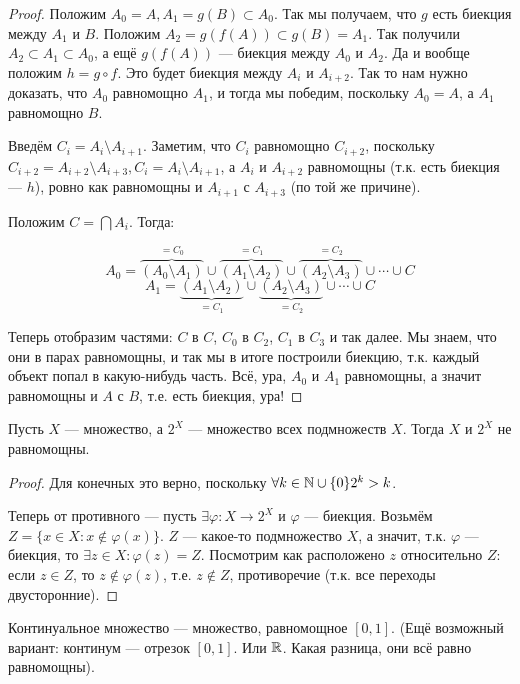 \begin{proof}
	Положим $A_0 = A, A_1 = g(B) \subset A_0$. Так мы получаем, что $g$ есть биекция между $A_1$ и $B$. Положим $A_2 = g(f(A)) \subset g(B) = A_1$. Так получили $A_2 \subset A_1 \subset A_0$, а ещё $g(f(A))$ --- биекция между $A_0$ и $A_2$. Да и вообще положим $h = g \circ f$. Это будет биекция между $A_i$ и $A_{i + 2}$. Так то нам нужно доказать, что $A_0$ равномощно $A_1$, и тогда мы победим, поскольку $A_0 = A$, а $A_1$ равномощно $B$. 

	Введём $C_i = A_i \setminus A_{i + 1}$. Заметим, что $C_i$ равномощно $C_{i+2}$, поскольку $C_{i+2} = A_{i + 2} \setminus A_{i + 3}, C_i = A_i \setminus A_{i+1}$, а $A_i$ и $A_{i+2}$ равномощны (т.к. есть биекция --- $h$), ровно как равномощны и $A_{i+1}$ с $A_{i + 3}$ (по той же причине). 

	Положим $C = \bigcap A_i$. Тогда:

	{
	$$
	A_0 = \overbrace{(A_0 \setminus A_1)}^{=C_0} \cup \overbrace{(A_1 \setminus A_2)}^{=C_1} \cup \overbrace{(A_2 \setminus A_3)}^{=C_2} \cup \cdots \cup C
	$$
	$$
	A_1 = \underbrace{(A_1 \setminus A_2)}_{=C_1} \cup \underbrace{(A_2 \setminus A_3)}_{=C_2} \cup \cdots \cup C
	$$
	}

	Теперь отобразим частями: $C$ в $C$, $C_0$ в $C_2$, $C_1$ в $C_3$ и так далее. Мы знаем, что они в парах равномощны, и так мы в итоге построили биекцию, т.к. каждый объект попал в какую-нибудь часть. Всё, ура, $A_0$ и $A_1$ равномощны, а значит равномощны и $A$ с $B$, т.е. есть биекция, ура!
\end{proof}

\begin{theorem}
	Пусть $X$ --- множество, а $2^X$ --- множество всех подмножеств $X$. Тогда $X$ и $2^X$ не равномощны.
\end{theorem}
\begin{proof}
	Для конечных это верно, поскольку $\forall k \in \mathbb{N} \cup \{0\}  2^k > k$. 

	Теперь от противного --- пусть $\exists \varphi : X \to 2^X$ и $\varphi$ --- биекция. Возьмём $Z = \{ x \in X \colon x \not \in \varphi(x) \}$. $Z$ --- какое-то подмножество $X$, а значит, т.к. $\varphi$ --- биекция, то $\exists z \in X : \varphi(z) = Z$. Посмотрим как расположено $z$ относительно $Z$: если $z \in Z$, то $z \not \in \varphi(z)$, т.е. $z \not \in Z$, противоречие (т.к. все переходы двусторонние).
\end{proof}

\begin{definition}
	Континуальное множество --- множество, равномощное $[0, 1]$. (Ещё возможный вариант: континум --- отрезок $[0, 1]$. Или $\mathbb{R}$. Какая разница, они всё равно равномощны).
\end{definition}

